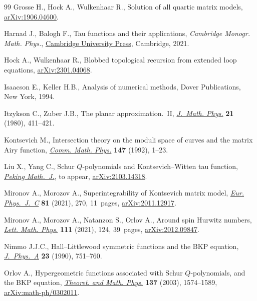 \begin{thebibliography}{99}
Grosse H., Hock A., Wulkenhaar R., Solution of all quartic matrix models,
 \href{https://arxiv.org/abs/1906.04600}{arXiv:1906.04600}.

Harnad J., Balogh F., Tau functions and their applications, \textit{Cambridge Monogr. Math. Phys.}, \href{https://doi.org/10.1017/9781108610902}{Cambridge University Press}, Cambridge, 2021.

Hock A., Wulkenhaar R., Blobbed topological recursion from extended loop
 equations, \href{https://arxiv.org/abs/2301.04068}{arXiv:2301.04068}.

Isaacson E., Keller H.B., Analysis of numerical methods, Dover Publications,
 New York, 1994.

Itzykson C., Zuber J.B., The planar approximation.~{II}, \href{https://doi.org/10.1063/1.524438}{\textit{J.~Math.
 Phys.}} \textbf{21} (1980), 411--421.

Kontsevich M., Intersection theory on the moduli space of curves and the matrix
 {A}iry function, \href{https://doi.org/10.1007/BF02099526}{\textit{Comm. Math. Phys.}} \textbf{147} (1992), 1--23.

Liu X., Yang C., Schur ${Q}$-polynomials and {K}ontsevich--{W}itten tau
 function, \href{https://doi.org/10.1007/s42543-023-00064-6}{\textit{Peking Math.~J.}}, {t}o appear, \href{https://arxiv.org/abs/2103.14318}{arXiv:2103.14318}.

Mironov A., Morozov A., Superintegrability of {K}ontsevich matrix model,
 \href{https://doi.org/10.1140/epjc/s10052-021-09030-x}{\textit{Eur. Phys.~J.~C}} \textbf{81} (2021), 270, 11~pages,
 \href{https://arxiv.org/abs/2011.12917}{arXiv:2011.12917}.

Mironov A., Morozov A., Natanzon S., Orlov A., Around spin {H}urwitz numbers,
 \href{https://doi.org/10.1007/s11005-021-01457-3}{\textit{Lett. Math. Phys.}} \textbf{111} (2021), 124, 39~pages,
 \href{https://arxiv.org/abs/2012.09847}{arXiv:2012.09847}.

Nimmo J.J.C., Hall--{L}ittlewood symmetric functions and the {BKP} equation,
 \href{https://doi.org/10.1088/0305-4470/23/5/018}{\textit{J.~Phys.~A}} \textbf{23} (1990), 751--760.

Orlov A., Hypergeometric functions associated with {S}chur {$Q$}-polynomials,
 and the {BKP} equation, \href{https://doi.org/10.1023/A:1027370004436}{\textit{Theoret. and Math. Phys.}} \textbf{137}
 (2003), 1574--1589, \href{https://arxiv.org/abs/math-ph/0302011}{arXiv:math-ph/0302011}.


\end{thebibliography}
